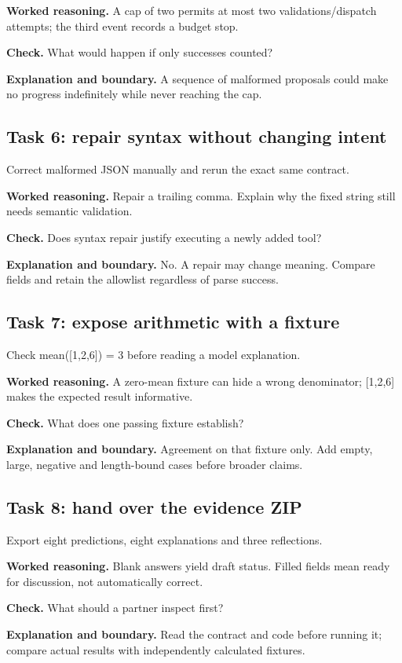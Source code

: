 \textbf{Worked reasoning.} A cap of two permits at most two validations/dispatch attempts; the third event records a budget stop.

\textbf{Check.} What would happen if only successes counted?

\textbf{Explanation and boundary.} A sequence of malformed proposals could make no progress indefinitely while never reaching the cap.

\subsection{Task 6: repair syntax without changing intent}
Correct malformed JSON manually and rerun the exact same contract.

\textbf{Worked reasoning.} Repair a trailing comma. Explain why the fixed string still needs semantic validation.

\textbf{Check.} Does syntax repair justify executing a newly added tool?

\textbf{Explanation and boundary.} No. A repair may change meaning. Compare fields and retain the allowlist regardless of parse success.

\subsection{Task 7: expose arithmetic with a fixture}
Check mean([1,2,6]) = 3 before reading a model explanation.

\textbf{Worked reasoning.} A zero-mean fixture can hide a wrong denominator; [1,2,6] makes the expected result informative.

\textbf{Check.} What does one passing fixture establish?

\textbf{Explanation and boundary.} Agreement on that fixture only. Add empty, large, negative and length-bound cases before broader claims.

\subsection{Task 8: hand over the evidence ZIP}
Export eight predictions, eight explanations and three reflections.

\textbf{Worked reasoning.} Blank answers yield draft status. Filled fields mean ready for discussion, not automatically correct.

\textbf{Check.} What should a partner inspect first?

\textbf{Explanation and boundary.} Read the contract and code before running it; compare actual results with independently calculated fixtures.

